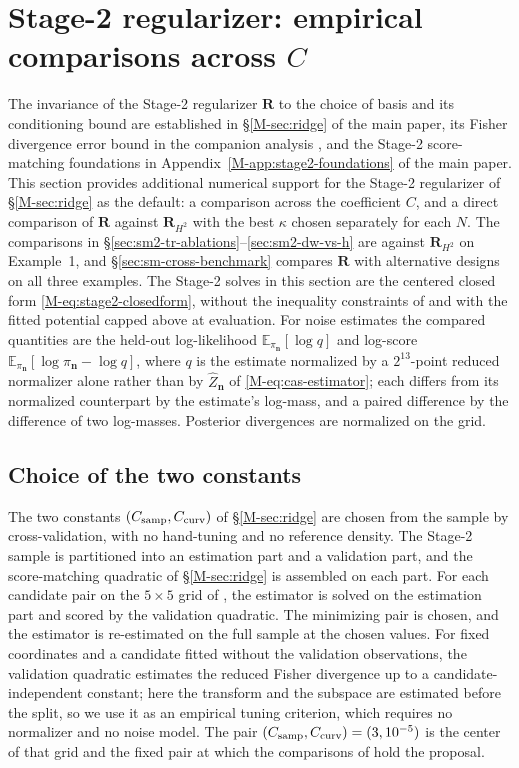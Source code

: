 \documentclass[supplement,review,hidelinks,onefignum,onetabnum]{siamart251216}
\newcommand{\EE}{\mathbb{E}}
\newcommand{\mR}{\bm{R}}
\newcommand{\vn}{\bm{n}}
\begin{document}
\section{\texorpdfstring{Stage-2 regularizer: empirical comparisons across $C$}{Stage-2 regularizer: empirical comparisons across C}}
\label{sm:s2reg-empirical}

The invariance of the Stage-2 regularizer $\mR$ to the choice of basis and its conditioning bound are established in \S\ref{M-sec:ridge} of the main paper, its Fisher divergence error bound in the companion analysis \cite{CAS_partII}, and the Stage-2 score-matching foundations in Appendix~\ref{M-app:stage2-foundations} of the main paper. This section provides additional numerical support for the Stage-2 regularizer of \S\ref{M-sec:ridge} as the default: a comparison across the coefficient $C$, and a direct comparison of $\mR$ against $\mR_{H^2}$ with the best $\kappa$ chosen separately for each $N$. The comparisons in \S\ref{sec:sm2-tr-ablations}--\ref{sec:sm2-dw-vs-h} are against $\mR_{H^2}$ on Example~1, and \S\ref{sec:sm-cross-benchmark} compares $\mR$ with alternative designs on all three examples. The Stage-2 solves in this section are the centered closed form \eqref{M-eq:stage2-closedform}, without the inequality constraints of  and with the fitted potential capped above at evaluation. For noise estimates the compared quantities are the held-out log-likelihood $\EE_{\pi_{\vn}}[\log q]$ and log-score $\EE_{\pi_{\vn}}[\log\pi_{\vn} - \log q]$, where $q$ is the estimate normalized by a $2^{13}$-point reduced normalizer alone rather than by $\widehat Z_{\vn}$ of \eqref{M-eq:cas-estimator}; each differs from its normalized counterpart by the estimate's log-mass, and a paired difference by the difference of two log-masses. Posterior divergences are normalized on the grid.

\subsection{Choice of the two constants}
\label{sec:sm2-selection}
The two constants $(C_{\rm samp}, C_{\rm curv})$ of \S\ref{M-sec:ridge} are chosen from the sample by cross-validation, with no hand-tuning and no reference density. The Stage-2 sample is partitioned into an estimation part and a validation part, and the score-matching quadratic of \S\ref{M-sec:ridge} is assembled on each part. For each candidate pair on the $5\times5$ grid of , the estimator is solved on the estimation part and scored by the validation quadratic. The minimizing pair is chosen, and the estimator is re-estimated on the full sample at the chosen values. For fixed coordinates and a candidate fitted without the validation observations, the validation quadratic estimates the reduced Fisher divergence up to a candidate-independent constant; here the transform and the subspace are estimated before the split, so we use it as an empirical tuning criterion, which requires no normalizer and no noise model. The pair $(C_{\rm samp}, C_{\rm curv}) = (3, 10^{-5})$ is the center of that grid and the fixed pair at which the comparisons of  hold the proposal.
\end{document}
